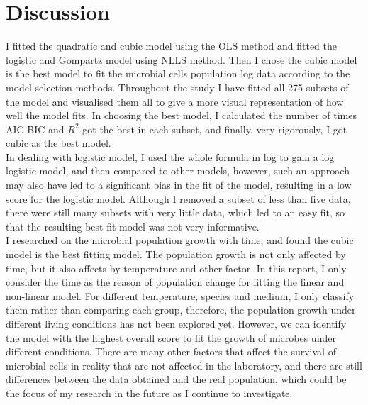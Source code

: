 \documentclass[11pt]{article}
\begin{document}
\section{Discussion}
I fitted the quadratic and cubic model using the OLS method and fitted the logistic and Gompartz model using NLLS method. Then I chose the cubic model is the best model to fit the microbial cells population log data according to the model selection methods. Throughout the study I have fitted all 275 subsets of the model and visualised them all to give a more visual representation of how well the model fits. In choosing the best model, I calculated the number of times AIC BIC and \(R^2\) got the best in each subset, and finally, very rigorously, I got cubic as the best model.\\
In dealing with logistic model, I used the whole formula in log to gain a log logistic model, and then compared to other models, however, such an approach may also have led to a significant bias in the fit of the model, resulting in a low score for the logistic model.
Although I removed a subset of less than five data, there were still many subsets with very little data, which led to an easy fit, so that the resulting best-fit model was not very informative.\\
I researched on the microbial population growth with time, and found the cubic model is the best fitting model. The population growth is not only affected by time, but it also affects by temperature and other factor. In this report, I only consider the time as the reason of population change for fitting the linear and non-linear model. For different temperature, species and medium, I only classify them rather than comparing each group, therefore, the population growth under different living conditions has not been explored yet. However, we can identify the model with the highest overall score to fit the growth of microbes under different conditions. There are many other factors that affect the survival of microbial cells in reality that are not affected in the laboratory, and there are still differences between the data obtained and the real population, which could be the focus of my research in the future as I continue to investigate.



\end{document}
